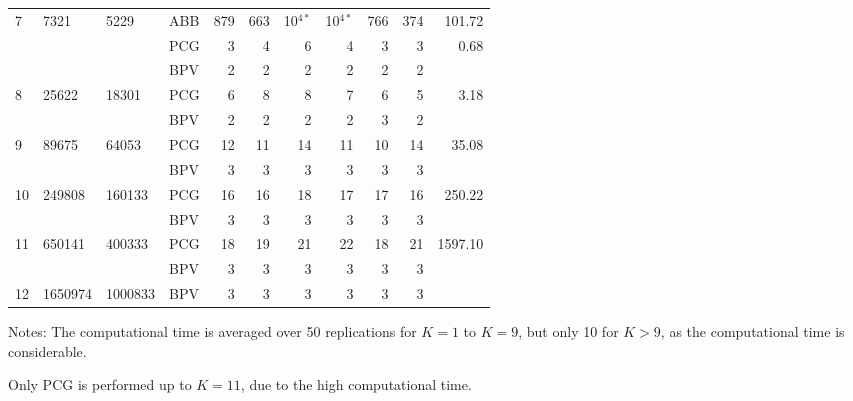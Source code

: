 \documentclass[11pt]{article}
\newcommand{\0}{\phantom{0}}
\begin{document}
\begin{table}[ht]
\begin{threeparttable}
\begin{tabular}{llllrrrrrrr}
			\midrule
			7 & 7321 & 5229 & ABB & 879 & 663 & 10$^{4*}$ & 10$^{4*}$ & 766 & 374 & 101.72 \\
			& & & PCG & 3 & 4 & 6 & 4 & 3 & 3 & 0.68 \\
			& & & BPV & 2 & 2 & 2 & 2 & 2 & 2 & \pmb{$0.57$} \\
			\midrule
			8 & 25622 & 18301 & PCG & 6 & 8 & 8 & 7 & 6 & 5 & 3.18 \\
			& & & BPV & 2 & 2 & 2 & 2 & 3 & 2 & \pmb{$1.76$} \\
			\midrule
			9 & 89675 & 64053 & PCG & 12 & 11 & 14 & 11 & 10 & 14 & 35.08 \\	
			& & & BPV & 3 & 3 & 3 & 3 & 3 & 3 & \pmb{$6.45$} \\	
			\midrule	
			10 & 249808 & 160133 & PCG & 16 & 16 & 18 & 17 & 17 & 16 & 250.22 \\
			& & & BPV & 3 & 3 & 3 & 3 & 3 & 3 & \pmb{$21.00$} \\
			\midrule
			11 & 650141 & 400333 & PCG & 18 & 19 & 21 & 22 & 18 & 21 & 1597.10 \\
			& & & BPV & 3 & 3 & 3 & 3 & 3 & 3 & \pmb{$56.84$} \\
			\midrule
			12 & 1650974 & 1000833 & BPV & 3 & 3 & 3 & 3 & 3 & 3 & \pmb{$3247.09$}\\
			\bottomrule
		\end{tabular}
		\begin{tablenotes} 
			\item [] Notes: The computational time is averaged over 50 replications for $K = 1$ to $K = 9$, but only 10 for $K > 9$, as the computational time is considerable.
			\item [] Only PCG is performed up to $K = 11$, due to the high computational time.	
		\end{tablenotes}
	\end{threeparttable}
\end{table}

\clearpage
\end{document}
